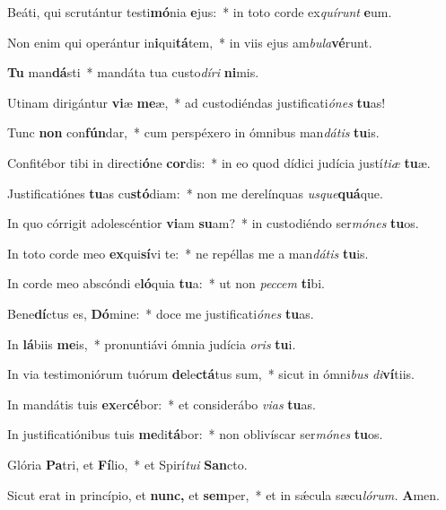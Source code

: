 \item Beáti, qui scrutántur testi\textbf{mó}nia \textbf{e}jus:~* in toto corde ex\tinyhspace\textit{quírunt} \textbf{e}um.
\item Non enim qui operántur in\textbf{i}qui\textbf{tá}tem,~* in viis ejus am\textit{bula}\textbf{vé}runt.
\item \textbf{Tu} man\textbf{dá}sti~* mandáta tua custo\textit{díri} \textbf{ni}mis.
\item Utinam dirigántur \textbf{vi}æ \textbf{me}æ,~* ad custodiéndas justificati\textit{ónes} \textbf{tu}as!
\item Tunc \textbf{non} con\textbf{fún}dar,~* cum perspéxero in ómnibus man\textit{dátis} \textbf{tu}is.
\item Confitébor tibi in directi\textbf{ó}ne \textbf{cor}dis:~* in eo quod dídici judícia justí\textit{tiæ} \textbf{tu}æ.
\item Justificatiónes \textbf{tu}as cu\textbf{stó}diam:~* non me derelínquas \textit{usque}\textbf{quá}que.
\item In quo córrigit adolescéntior \textbf{vi}am \textbf{su}am?~* in custodiéndo ser\textit{mónes} \textbf{tu}os.
\item In toto corde meo \textbf{ex}qui\textbf{sí}vi te:~* ne repéllas me a man\tinyhspace\textit{dátis} \textbf{tu}is.
\item In corde meo abscóndi e\textbf{ló}quia \textbf{tu}a:~* ut non \textit{peccem} \textbf{ti}bi.
\item Bene\textbf{dí}ctus es, \textbf{Dó}mine:~* doce me justificati\textit{ónes} \textbf{tu}as.
\item In \textbf{lá}biis \textbf{me}is,~* pronuntiávi ómnia judícia \textit{oris} \textbf{tu}i.
\item In via testimoniórum tuórum \textbf{de}le\textbf{ctá}tus sum,~* sicut in ómni\textit{bus} \textit{di}\textbf{ví}tiis.
\item In mandátis tuis \textbf{ex}er\textbf{cé}bor:~* et considerábo \textit{vias} \textbf{tu}as.
\item In justificatiónibus tuis \textbf{me}di\textbf{tá}bor:~* non oblivíscar ser\textit{mónes} \textbf{tu}os.
\item Glória \textbf{Pa}tri, et \textbf{Fí}lio,~* et Spirí\tinyhspace\textit{tui} \textbf{San}cto.
\item Sicut erat in princípio, et \textbf{nunc,} et \textbf{sem}per,~* et in sǽcula sæcu\tinyhspace\textit{lórum.} \textbf{A}men.